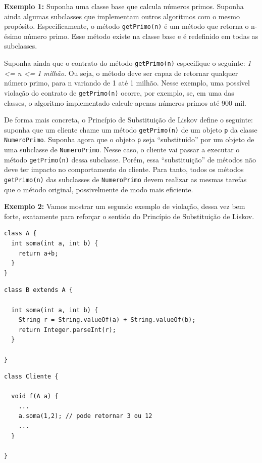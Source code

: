 \documentclass[
  11pt,
  twoside]{book}
\newcommand{\passthrough}[1]{#1}
\begin{document}
\textbf{Exemplo 1:} Suponha uma classe base que calcula números primos.
Suponha ainda algumas subclasses que implementam outros algoritmos com o
mesmo propósito. Especificamente, o método
\passthrough{\lstinline!getPrimo(n)!} é um método que retorna o n-ésimo
número primo. Esse método existe na classe base e é redefinido em todas
as subclasses.

Suponha ainda que o contrato do método
\passthrough{\lstinline!getPrimo(n)!} especifique o seguinte: \emph{1
\textless= n \textless= 1 milhão}. Ou seja, o método deve ser capaz de
retornar qualquer número primo, para n variando de 1 até 1 milhão. Nesse
exemplo, uma possível violação do contrato de
\passthrough{\lstinline!getPrimo(n)!} ocorre, por exemplo, se, em uma
das classes, o algoritmo implementado calcule apenas números primos até
900 mil.

De forma mais concreta, o Princípio de Substituição de Liskov define o
seguinte: suponha que um cliente chame um método
\passthrough{\lstinline!getPrimo(n)!} de um objeto
\passthrough{\lstinline!p!} da classe
\passthrough{\lstinline!NumeroPrimo!}. Suponha agora que o objeto
\passthrough{\lstinline!p!} seja ``substituído'' por um objeto de uma
subclasse de \passthrough{\lstinline!NumeroPrimo!}. Nesse caso, o
cliente vai passar a executar o método
\passthrough{\lstinline!getPrimo(n)!} dessa subclasse. Porém, essa
``substituição'' de métodos não deve ter impacto no comportamento do
cliente. Para tanto, todos os métodos
\passthrough{\lstinline!getPrimo(n)!} das subclasses de
\passthrough{\lstinline!NumeroPrimo!} devem realizar as mesmas tarefas
que o método original, possivelmente de modo mais eficiente.

\textbf{Exemplo 2:} Vamos mostrar um segundo exemplo de violação, dessa
vez bem forte, exatamente para reforçar o sentido do Princípio de
Substituição de Liskov.

\begin{lstlisting}
class A {
  int soma(int a, int b) {
    return a+b;
  }
}
\end{lstlisting}

\begin{lstlisting}
class B extends A {

  int soma(int a, int b) {
    String r = String.valueOf(a) + String.valueOf(b);
    return Integer.parseInt(r);
  }

}
\end{lstlisting}

\begin{lstlisting}
class Cliente {

  void f(A a) {
    ...
    a.soma(1,2); // pode retornar 3 ou 12
    ...
  }

}
\end{lstlisting}
\end{document}
